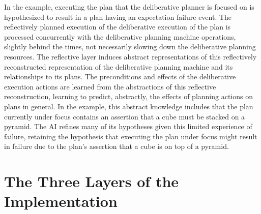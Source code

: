 In the example, executing the plan that the deliberative planner is
focused on is hypothesized to result in a plan having an expectation
failure event.  The reflectively planned execution of the deliberative
execution of the plan is processed concurrently with the deliberative
planning machine operations, slightly behind the times, not
necessarily slowing down the deliberative planning resources.  The
reflective layer induces abstract representations of this reflectively
reconstructed representation of the deliberative planning machine and
its relationships to its plans.  The preconditions and effects of the
deliberative execution actions are learned from the abstractions of
this reflective reconstruction, learning to predict, abstractly, the
effects of planning actions on plans in general.  In the example, this
abstract knowledge includes that the plan currently under focus
contains an assertion that a cube must be stacked on a pyramid.  The
AI refines many of its hypotheses given this limited experience of
failure, retaining the hypothesis that executing the plan under focus
might result in failure due to the plan's assertion that a cube is on
top of a pyramid.

\section{The Three Layers of the Implementation}

